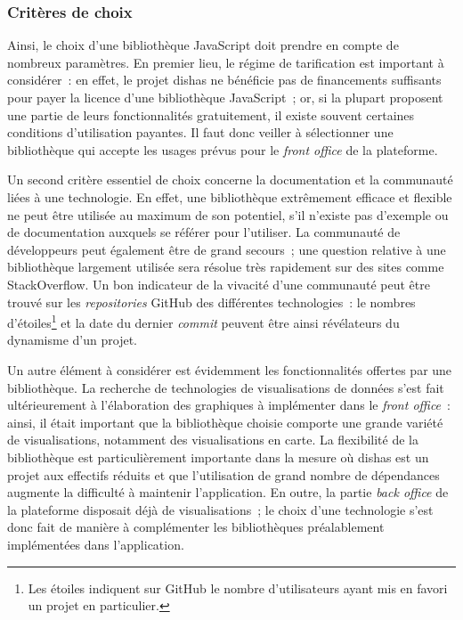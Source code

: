 \documentclass[a4paper,12pt,twoside]{book}
\newcommand{\eng}{\emph}
\newcommand{\fo}{\eng{front office}\xspace}
\newcommand{\dishas}{\gls{dishas}\xspace}
\begin{document}
			\subsubsection{Critères de choix}
Ainsi, le choix d'une bibliothèque JavaScript doit prendre en compte de nombreux paramètres. En premier lieu, le régime de tarification est important à considérer~: en effet, le projet \dishas ne bénéficie pas de financements suffisants pour payer la licence d'une bibliothèque JavaScript~; or, si la plupart proposent une partie de leurs fonctionnalités gratuitement, il existe souvent certaines conditions d'utilisation payantes. Il faut donc veiller à sélectionner une bibliothèque qui accepte les usages prévus pour le \fo de la plateforme.

Un second critère essentiel de choix concerne la documentation et la communauté liées à une technologie. En effet, une bibliothèque extrêmement efficace et flexible ne peut être utilisée au maximum de son potentiel, s'il n'existe pas d'exemple ou de documentation auxquels se référer pour l'utiliser. La communauté de développeurs peut également être de grand secours~; une question relative à une bibliothèque largement utilisée sera résolue très rapidement sur des sites comme StackOverflow. Un bon indicateur de la vivacité d'une communauté peut être trouvé sur les \eng{repositories} GitHub des différentes technologies~: le nombres d'étoiles\footnote{Les étoiles indiquent sur GitHub le nombre d'utilisateurs ayant mis en favori un projet en particulier.} et la date du dernier \eng{commit} peuvent être ainsi révélateurs du dynamisme d'un projet.

Un autre élément à considérer est évidemment les fonctionnalités offertes par une bibliothèque. La recherche de technologies de visualisations de données s'est fait ultérieurement à l'élaboration des graphiques à implémenter dans le \fo~: ainsi, il était important que la bibliothèque choisie comporte une grande variété de visualisations, notamment des visualisations en carte. La flexibilité de la bibliothèque est particulièrement importante dans la mesure où \dishas est un projet aux effectifs réduits et que l'utilisation de grand nombre de dépendances augmente la difficulté à maintenir l'application. En outre, la partie \eng{back office} de la plateforme disposait déjà de visualisations~; le choix d'une technologie s'est donc fait de manière à complémenter les bibliothèques préalablement implémentées dans l'application.
\end{document}
